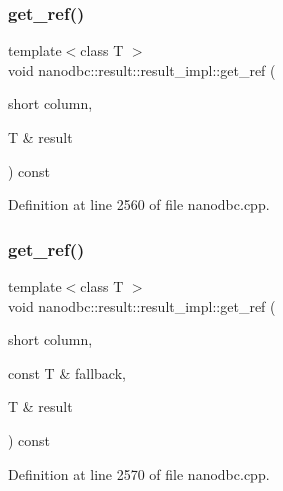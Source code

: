 \subsubsection{\texorpdfstring{get\_ref()}{get\_ref()}\hspace{0.1cm}{\footnotesize\ttfamily [1/4]}}
{\footnotesize\ttfamily template$<$class T $>$ \\
void nanodbc\+::result\+::result\+\_\+impl\+::get\+\_\+ref (\begin{DoxyParamCaption}\item[{short}]{column,  }\item[{T \&}]{result }\end{DoxyParamCaption}) const\hspace{0.3cm}{\ttfamily [inline]}}



Definition at line 2560 of file nanodbc.\+cpp.

\mbox{\label{classnanodbc_1_1result_1_1result__impl_ad5042fe5c38974cfe90ed3eb00fb9f84}} 
\subsubsection{\texorpdfstring{get\_ref()}{get\_ref()}\hspace{0.1cm}{\footnotesize\ttfamily [2/4]}}
{\footnotesize\ttfamily template$<$class T $>$ \\
void nanodbc\+::result\+::result\+\_\+impl\+::get\+\_\+ref (\begin{DoxyParamCaption}\item[{short}]{column,  }\item[{const T \&}]{fallback,  }\item[{T \&}]{result }\end{DoxyParamCaption}) const\hspace{0.3cm}{\ttfamily [inline]}}



Definition at line 2570 of file nanodbc.\+cpp.

\mbox{\label{classnanodbc_1_1result_1_1result__impl_aa8f36e2abf3d3440bc98c7bf8fe282f4}} 
